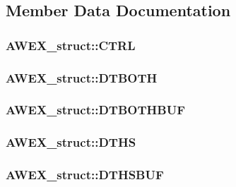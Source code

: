\subsection{Member Data Documentation}
\hypertarget{struct_a_w_e_x__struct_aac954aa43ab948ad37adb7cf0be52057}{
\subsubsection[{CTRL}]{ {\bf AWEX\_\-struct::CTRL}}}
\label{struct_a_w_e_x__struct_aac954aa43ab948ad37adb7cf0be52057}
\hypertarget{struct_a_w_e_x__struct_ad5b03a3a361ce40ad64afe30787cf20d}{
\subsubsection[{DTBOTH}]{ {\bf AWEX\_\-struct::DTBOTH}}}
\label{struct_a_w_e_x__struct_ad5b03a3a361ce40ad64afe30787cf20d}
\hypertarget{struct_a_w_e_x__struct_aea8f66130481bddfe1d0d8768563ff8f}{
\subsubsection[{DTBOTHBUF}]{ {\bf AWEX\_\-struct::DTBOTHBUF}}}
\label{struct_a_w_e_x__struct_aea8f66130481bddfe1d0d8768563ff8f}
\hypertarget{struct_a_w_e_x__struct_af868e8ac0f715ff6d21b4788f8c95e9f}{
\subsubsection[{DTHS}]{ {\bf AWEX\_\-struct::DTHS}}}
\label{struct_a_w_e_x__struct_af868e8ac0f715ff6d21b4788f8c95e9f}
\hypertarget{struct_a_w_e_x__struct_a71f36c4a38f9ebe9af57c0b761d63054}{
\subsubsection[{DTHSBUF}]{ {\bf AWEX\_\-struct::DTHSBUF}}}
